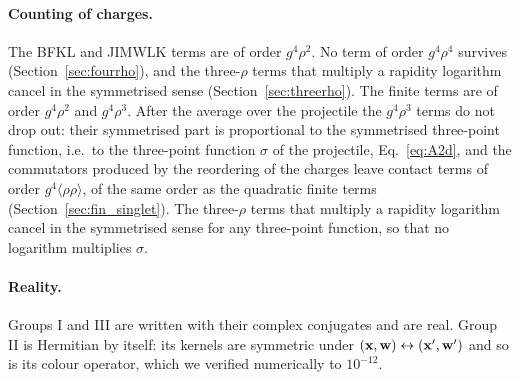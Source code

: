 \paragraph{Counting of charges.} The BFKL and JIMWLK terms are of order $g^4\rho^2$. No term of order $g^4\rho^4$ survives (Section~\ref{sec:fourrho}), and the three-$\rho$ terms that multiply a rapidity logarithm cancel in the symmetrised sense (Section~\ref{sec:threerho}). The finite terms are of order $g^4\rho^2$ and $g^4\rho^3$. After the average over the projectile the $g^4\rho^3$ terms do not drop out: their symmetrised part is proportional to the symmetrised three-point function, i.e.\ to the three-point function $\sigma$ of the projectile, Eq.~\eqref{eq:A2d}, and the commutators produced by the reordering of the charges leave contact terms of order $g^4\langle\rho\rho\rangle$, of the same order as the quadratic finite terms (Section~\ref{sec:fin_singlet}). The three-$\rho$ terms that multiply a rapidity logarithm cancel in the symmetrised sense for any three-point function, so that no logarithm multiplies $\sigma$.

\paragraph{Reality.} Groups I and III are written with their complex conjugates and are real. Group II is Hermitian by itself: its kernels are symmetric under $(\mathbf{x},\mathbf{w})\leftrightarrow(\mathbf{x}',\mathbf{w}')$ and so is its colour operator, which we verified numerically to $10^{-12}$.

